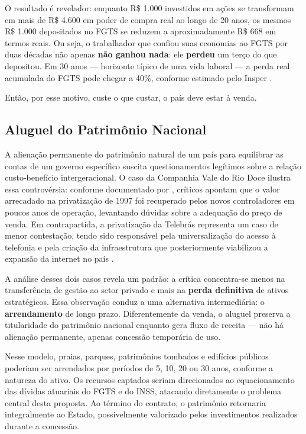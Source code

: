 O resultado é revelador: enquanto R\$ 1.000 investidos em ações se transformam em mais de R\$ 4.600 em poder de compra real ao longo de 20 anos, os mesmos R\$ 1.000 depositados no FGTS se reduzem a aproximadamente R\$ 668 em termos reais. Ou seja, o trabalhador que confiou suas economias ao FGTS por duas décadas não apenas \textbf{não ganhou nada}: ele \textbf{perdeu} um terço do que depositou. Em 30 anos --- horizonte típico de uma vida laboral --- a perda real acumulada do FGTS pode chegar a 40\%, conforme estimado pelo Insper \cite{insper2019}.

Então, por esse motivo, custe o que custar, o país deve estar à venda.

\subsection{Aluguel do Patrimônio Nacional}

A alienação permanente do patrimônio natural de um país para equilibrar as contas de um governo específico suscita questionamentos legítimos sobre a relação custo-benefício intergeracional. O caso da Companhia Vale do Rio Doce ilustra essa controvérsia: conforme documentado por , críticos apontam que o valor arrecadado na privatização de 1997 foi recuperado pelos novos controladores em poucos anos de operação, levantando dúvidas sobre a adequação do preço de venda. Em contrapartida, a privatização da Telebrás representa um caso de menor contestação, tendo sido responsável pela universalização do acesso à telefonia e pela criação da infraestrutura que posteriormente viabilizou a expansão da internet no país \cite{telebras1998}.

A análise desses dois casos revela um padrão: a crítica concentra-se menos na transferência de gestão ao setor privado e mais na \textbf{perda definitiva} de ativos estratégicos. Essa observação conduz a uma alternativa intermediária: o \textbf{arrendamento} de longo prazo. Diferentemente da venda, o aluguel preserva a titularidade do patrimônio nacional enquanto gera fluxo de receita --- não há alienação permanente, apenas concessão temporária de uso.

Nesse modelo, praias, parques, patrimônios tombados e edifícios públicos poderiam ser arrendados por períodos de 5, 10, 20 ou 30 anos, conforme a natureza do ativo. Os recursos captados seriam direcionados ao equacionamento das dívidas atuariais do FGTS e do INSS, atacando diretamente o problema central desta proposta. Ao término do contrato, o patrimônio retornaria integralmente ao Estado, possivelmente valorizado pelos investimentos realizados durante a concessão.

